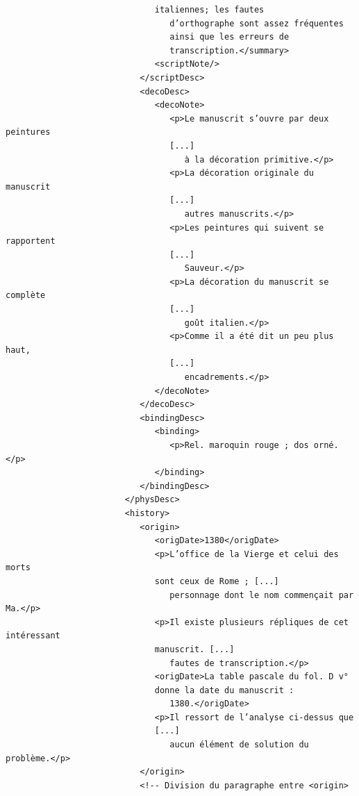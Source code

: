 \documentclass[a4paper,12pt,twoside]{book}
\begin{document}
\begin{verbatim}
                              italiennes; les fautes
                                 d’orthographe sont assez fréquentes 
                                 ainsi que les erreurs de
                                 transcription.</summary>
                              <scriptNote/>
                           </scriptDesc>
                           <decoDesc>
                              <decoNote>
                                 <p>Le manuscrit s’ouvre par deux peintures
                                 [...]
                                    à la décoration primitive.</p>
                                 <p>La décoration originale du manuscrit
                                 [...]
                                    autres manuscrits.</p>
                                 <p>Les peintures qui suivent se rapportent
                                 [...]
                                    Sauveur.</p>
                                 <p>La décoration du manuscrit se complète
                                 [...]
                                    goût italien.</p>
                                 <p>Comme il a été dit un peu plus haut, 
                                 [...]
                                    encadrements.</p>
                              </decoNote>
                           </decoDesc>
                           <bindingDesc>
                              <binding>
                                 <p>Rel. maroquin rouge ; dos orné.</p>
                              </binding>
                           </bindingDesc>
                        </physDesc>
                        <history>
                           <origin>
                              <origDate>1380</origDate>
                              <p>L’office de la Vierge et celui des morts 
                              sont ceux de Rome ; [...]
                                 personnage dont le nom commençait par Ma.</p>
                              <p>Il existe plusieurs répliques de cet intéressant
                              manuscrit. [...]
                                 fautes de transcription.</p>
                              <origDate>La table pascale du fol. D v°
                              donne la date du manuscrit :
                                 1380.</origDate>
                              <p>Il ressort de l’analyse ci-dessus que 
                              [...]
                                 aucun élément de solution du problème.</p>
                           </origin>
                           <!-- Division du paragraphe entre <origin> 

\end{verbatim}
\end{document}
